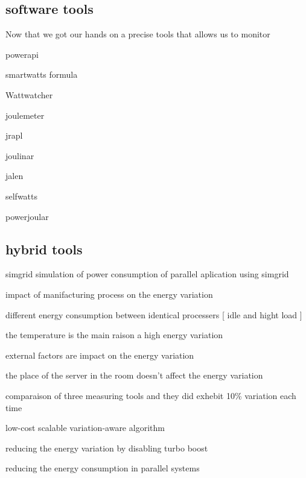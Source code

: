 \subsection{software tools}
Now that we got our hands on a precise tools that allows us to monitor

powerapi \cite{colmant2018next}

smartwatts formula \cite{fieni2020smartwatts}

Wattwatcher \cite{lebeane2015watt}

joulemeter \cite{kothari2009joulemeter}\cite{jagroep2017energy}

jrapl \cite{guimaraes2016some} \cite{liu2015data}

joulinar \cite{islam2016measuring} \cite{noureddine2016jolinar}

jalen \cite{noureddine2015monitoring}

selfwatts \cite{fieni2021selfwatts}

powerjoular \cite{noureddine2022powerjoular}
\subsection{hybrid tools}


simgrid simulation of power consumption of parallel aplication using simgrid \cite{heinrich2017predicting}

impact of manifacturing process on the energy variation \cite{coles2014comparing}

different energy consumption between identical processers [ idle and hight load ]\cite{von2016variations}

the temperature is the main raison a high energy variation \cite{wang2018potential}

external factors are impact on the energy variation \cite{mukherjee2009spatio}

the place of the server in the room doesn't affect the energy variation \cite{diouri2013your}

comparaison of three measuring tools and they did exhebit 10\% variation each time \cite{inadomi2015analyzing}

low-cost scalable variation-aware algorithm \cite{inadomi2015analyzing}

reducing the energy variation by disabling turbo boost \cite{acun2016variation}

reducing the energy consumption in parallel systems \cite{chasapis2016runtime}

